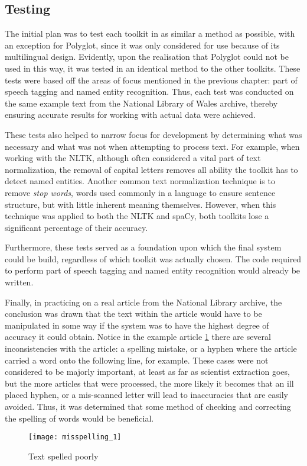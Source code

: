 \documentclass[11pt,a4paper]{book}
\begin{document}
\subsection{Testing}
The initial plan was to test each toolkit in as similar a method as possible, with an exception for Polyglot, since it was only considered for use because of its multilingual design. Evidently, upon the realisation that Polyglot could not be used in this way, it was tested in an identical method to the other toolkits. These tests were based off the areas of focus mentioned in the previous chapter: part of speech tagging and named entity recognition. Thus, each test was conducted on the same example text from the National Library of Wales archive, thereby ensuring accurate results for working with actual data were achieved. 

These tests also helped to narrow focus for development by determining what was necessary and what was not when attempting to process text. For example, when working with the NLTK, although often considered a vital part of text normalization, the removal of capital letters removes all ability the toolkit has to detect named entities. Another common text normalization technique is to remove \textit{stop words}, words used commonly in a language to ensure sentence structure, but with little inherent meaning themselves. However, when this technique was applied to both the NLTK and spaCy, both toolkits lose a significant percentage of their accuracy.

Furthermore, these tests served as a foundation upon which the final system could be build, regardless of which toolkit was actually chosen. The code required to perform part of speech tagging and named entity recognition would already be written.

Finally, in practicing on a real article from the National Library archive, the conclusion was drawn that the text within the article would have to be manipulated in some way if the system was to have the highest degree of accuracy it could obtain. Notice in the example article \ref{fig:misspelled} there are several inconsistencies with the article: a spelling mistake, or a hyphen where the article carried a word onto the following line, for example. These cases were not considered to be majorly important, at least as far as scientist extraction goes, but the more articles that were processed, the more likely it becomes that an ill placed hyphen, or a mis-scanned letter will lead to inaccuracies that are easily avoided. Thus, it was determined that some method of checking and correcting the spelling of words would be beneficial.
\begin{figure}[H]
	\texttt{[image: misspelling\_1]}
	\label{fig:misspelled}
	\caption{Text spelled poorly}
\end{figure}
\end{document}
